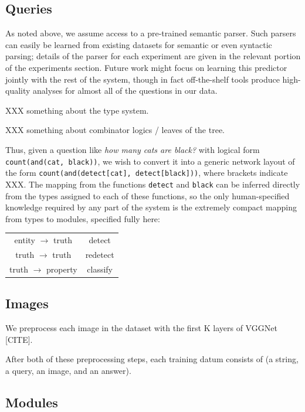 \documentclass[10pt,twocolumn,letterpaper]{article}
\begin{document}
\subsection{Queries}

As noted above, we assume access to a pre-trained semantic parser. Such parsers
can easily be learned from existing datasets for semantic or even syntactic
parsing; details of the parser for each experiment are given in the relevant
portion of the experiments section. Future work might focus on learning this
predictor jointly with the rest of the system, though in fact off-the-shelf
tools produce high-quality analyses for almost all of the questions in our
data.

XXX something about the type system.

XXX something about combinator logics / leaves of the tree.

Thus, given a question like \emph{how many cats are black?} with logical form
{\small\tt count(and(cat, black))}, we wish to convert it into a generic network
layout of the form {\small\tt count(and(detect[cat], detect[black]))}, where
brackets indicate XXX. The mapping from the functions {\small\tt detect} and
{\small\tt black} can be inferred directly from the types assigned to each of
these functions, so the only human-specified knowledge required by any part of
the system is the extremely compact mapping from types to modules, specified
fully here:

\begin{tabular}{cc}
  entity $\to$ truth & detect \\
  truth $\to$ truth & redetect \\
  truth $\to$ property & classify \\
\end{tabular}

\subsection{Images}

We preprocess each image in the dataset with the first K layers of VGGNet [CITE].

After both of these preprocessing steps, each training datum consists of (a
string, a query, an image, and an answer).

\subsection{Modules}
\end{document}
